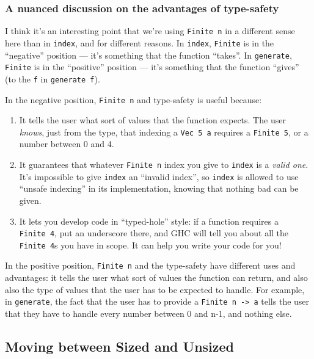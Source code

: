 \documentclass[]{article}
\begin{document}
\subsubsection{A nuanced discussion on the advantages of
type-safety}\label{a-nuanced-discussion-on-the-advantages-of-type-safety}

I think it's an interesting point that we're using \texttt{Finite\ n} in a
different sense here than in \texttt{index}, and for different reasons. In
\texttt{index}, \texttt{Finite} is in the ``negative'' position --- it's
something that the function ``takes''. In \texttt{generate}, \texttt{Finite} is
in the ``positive'' position --- it's something that the function ``gives'' (to
the \texttt{f} in \texttt{generate\ f}).

In the negative position, \texttt{Finite\ n} and type-safety is useful because:

\begin{enumerate}
\def\labelenumi{\arabic{enumi}.}
\tightlist
\item
  It tells the user what sort of values that the function expects. The user
  \emph{knows}, just from the type, that indexing a \texttt{Vec\ 5\ a} requires
  a \texttt{Finite\ 5}, or a number between 0 and 4.
\item
  It guarantees that whatever \texttt{Finite\ n} index you give to
  \texttt{index} is a \emph{valid one}. It's impossible to give \texttt{index}
  an ``invalid index'', so \texttt{index} is allowed to use ``unsafe indexing''
  in its implementation, knowing that nothing bad can be given.
\item
  It lets you develop code in ``typed-hole'' style: if a function requires a
  \texttt{Finite\ 4}, put an underscore there, and GHC will tell you about all
  the \texttt{Finite\ 4}s you have in scope. It can help you write your code for
  you!
\end{enumerate}

In the positive position, \texttt{Finite\ n} and the type-safety have different
uses and advantages: it tells the user what sort of values the function can
return, and also also the type of values that the user has to be expected to
handle. For example, in \texttt{generate}, the fact that the user has to provide
a \texttt{Finite\ n\ -\textgreater{}\ a} tells the user that they have to handle
every number between 0 and n-1, and nothing else.

\subsection{Moving between Sized and
Unsized}\label{moving-between-sized-and-unsized}
\end{document}
